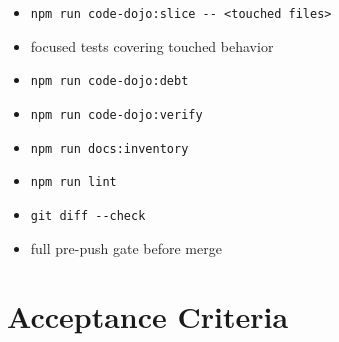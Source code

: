 \begin{itemize}
\tightlist
\item
  \texttt{n\allowbreak{}p\allowbreak{}m\allowbreak{} \allowbreak{}r\allowbreak{}u\allowbreak{}n\allowbreak{} \allowbreak{}c\allowbreak{}o\allowbreak{}d\allowbreak{}e\allowbreak{}-\allowbreak{}d\allowbreak{}o\allowbreak{}j\allowbreak{}o\allowbreak{}:\allowbreak{}s\allowbreak{}l\allowbreak{}i\allowbreak{}c\allowbreak{}e\allowbreak{} \allowbreak{}-\allowbreak{}-\allowbreak{} \allowbreak{}<\allowbreak{}t\allowbreak{}o\allowbreak{}u\allowbreak{}c\allowbreak{}h\allowbreak{}e\allowbreak{}d\allowbreak{} \allowbreak{}f\allowbreak{}i\allowbreak{}l\allowbreak{}e\allowbreak{}s\allowbreak{}>}
\item
  focused tests covering touched behavior
\item
  \texttt{n\allowbreak{}p\allowbreak{}m\allowbreak{} \allowbreak{}r\allowbreak{}u\allowbreak{}n\allowbreak{} \allowbreak{}c\allowbreak{}o\allowbreak{}d\allowbreak{}e\allowbreak{}-\allowbreak{}d\allowbreak{}o\allowbreak{}j\allowbreak{}o\allowbreak{}:\allowbreak{}d\allowbreak{}e\allowbreak{}b\allowbreak{}t}
\item
  \texttt{n\allowbreak{}p\allowbreak{}m\allowbreak{} \allowbreak{}r\allowbreak{}u\allowbreak{}n\allowbreak{} \allowbreak{}c\allowbreak{}o\allowbreak{}d\allowbreak{}e\allowbreak{}-\allowbreak{}d\allowbreak{}o\allowbreak{}j\allowbreak{}o\allowbreak{}:\allowbreak{}v\allowbreak{}e\allowbreak{}r\allowbreak{}i\allowbreak{}f\allowbreak{}y}
\item
  \texttt{n\allowbreak{}p\allowbreak{}m\allowbreak{} \allowbreak{}r\allowbreak{}u\allowbreak{}n\allowbreak{} \allowbreak{}d\allowbreak{}o\allowbreak{}c\allowbreak{}s\allowbreak{}:\allowbreak{}i\allowbreak{}n\allowbreak{}v\allowbreak{}e\allowbreak{}n\allowbreak{}t\allowbreak{}o\allowbreak{}r\allowbreak{}y}
\item
  \texttt{n\allowbreak{}p\allowbreak{}m\allowbreak{} \allowbreak{}r\allowbreak{}u\allowbreak{}n\allowbreak{} \allowbreak{}l\allowbreak{}i\allowbreak{}n\allowbreak{}t}
\item
  \texttt{g\allowbreak{}i\allowbreak{}t\allowbreak{} \allowbreak{}d\allowbreak{}i\allowbreak{}f\allowbreak{}f\allowbreak{} \allowbreak{}-\allowbreak{}-\allowbreak{}c\allowbreak{}h\allowbreak{}e\allowbreak{}c\allowbreak{}k}
\item
  full pre-push gate before merge
\end{itemize}

\section{Acceptance Criteria}\label{record-232-acceptance-criteria}

